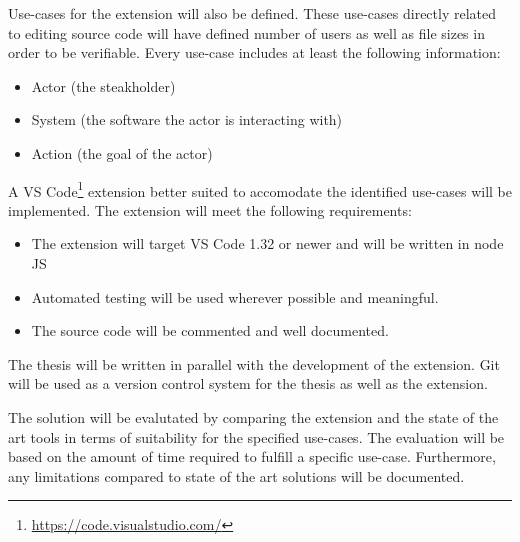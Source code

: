Use-cases for the extension will also be defined. These use-cases directly related to editing source code will have defined number of users as well as file sizes in order to be verifiable. 
Every use-case includes at least the following information:
\begin{itemize}
    \item Actor (the steakholder)
    \item System (the software the actor is interacting with)
    \item Action (the goal of the actor)
\end{itemize}
A VS Code\footnote{\href{https://code.visualstudio.com/}{https://code.visualstudio.com/}} extension better suited to accomodate the identified use-cases will be implemented.
The extension will meet the following requirements:
\begin{itemize}
    \item The extension will target VS Code 1.32 or newer and will be written in node JS
    \item Automated testing will be used wherever possible and meaningful.
    \item The source code will be commented and well documented.
\end{itemize}
The thesis will be written in parallel with the development of the extension. Git will be used as a version control system for the thesis as well as the extension.

The solution will be evalutated by comparing the extension and the state of the art tools in terms of suitability for the specified use-cases. 
The evaluation will be based on the amount of time required to fulfill a specific use-case.
Furthermore, any limitations compared to state of the art solutions will be documented.